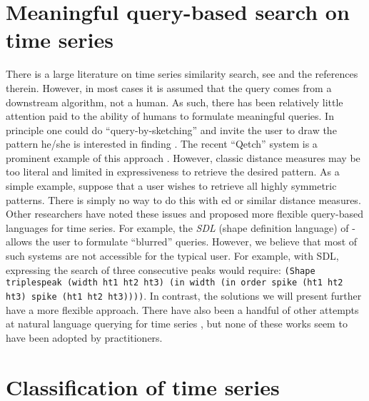 \section{Meaningful query-based search on time series}

There is a large literature on time series similarity search, see \cite{time_series} and the references therein. However, in most cases it is assumed that the query comes from a downstream algorithm, not a human. As such, there has been relatively little attention paid to the ability of humans to formulate meaningful queries. In principle one could do “query-by-sketching” and invite the user to draw the pattern he/she is interested in finding \cite{qetch, query_literature}. The recent “Qetch” system is a prominent example of this approach \cite{qetch}. However, classic distance measures may be too literal and limited in expressiveness to retrieve the desired pattern. As a simple example, suppose that a user wishes to retrieve all highly symmetric patterns. There is simply no way to do this with \gls{ed} or similar distance measures.
Other researchers have noted these issues and proposed more flexible query-based languages for time series. For example, the \textit{SDL} (shape definition language) of \cite{text_query1}- allows the user to formulate “blurred” queries. However, we believe that most of such systems are not accessible for the typical user. For example, with SDL, expressing the search of three consecutive peaks would require: 
\texttt{(Shape triplespeak (width ht1 ht2 ht3) (in width (in order spike (ht1 ht2 ht3) spike (ht1 ht2 ht3))))}. In contrast, the solutions we will present further have a more flexible approach. There have also been a handful of other attempts at natural language querying for time series \cite{puttinghuman, qute}, but none of these works seem to have been adopted by practitioners.

\section{Classification of time series}

